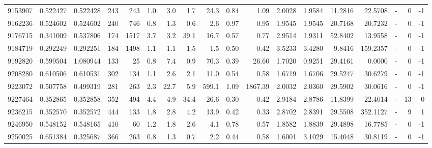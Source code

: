 \begin{tabular}{rrrrrrrrrrrrrrrlrr}
   9153907 & 0.522427 &   0.522428 &  243 &  243 &      1.0 &      3.0 &     1.7 &     24.3 &       0.84 &        1.09 &  2.0028 &  1.9584 &   11.2816 &   22.5708 &             - &        0 &         -1 \\
   9162236 & 0.524602 &   0.524602 &  240 &  746 &      0.8 &      1.3 &     0.6 &      2.6 &       0.97 &        0.95 &  1.9545 &  1.9545 &   20.7168 &   20.7232 &             - &        0 &         -1 \\
   9176715 & 0.341009 &   0.537806 &  174 & 1517 &      3.7 &      3.2 &    39.1 &     16.7 &       0.57 &        0.77 &  2.9514 &  1.9311 &   52.8402 &   13.9558 &             - &        0 &         -1 \\
   9184719 & 0.292249 &   0.292251 &  184 & 1498 &      1.1 &      1.1 &     1.5 &      1.5 &       0.50 &        0.42 &  3.5233 &  3.4280 &    9.8416 &  159.2357 &             - &        0 &         -1 \\
   9192820 & 0.599504 &   1.080944 &  133 &   25 &      0.8 &      7.4 &     0.9 &     70.3 &       0.39 &       26.60 &  1.7020 &  0.9251 &   29.4161 &    0.0000 &             - &        0 &         -1 \\
   9208280 & 0.610506 &   0.610531 &  302 &  134 &      1.1 &      2.6 &     2.1 &     11.0 &       0.54 &        0.58 &  1.6719 &  1.6706 &   29.5247 &   30.6279 &             - &        0 &         -1 \\
   9223072 & 0.507758 &   0.499319 &  281 &  263 &      2.3 &     22.7 &     5.9 &    599.1 &       1.09 &     1867.39 &  2.0032 &  2.0360 &   29.5902 &   30.0616 &             - &        0 &         -1 \\
   9227464 & 0.352865 &   0.352858 &  352 &  494 &      4.4 &      4.9 &    34.4 &     26.6 &       0.30 &        0.42 &  2.9184 &  2.8786 &   11.8399 &   22.4014 &             - &       13 &          0 \\
   9236215 & 0.352570 &   0.352572 &  444 &  133 &      1.8 &      2.8 &     4.2 &     13.9 &       0.42 &        0.33 &  2.8702 &  2.8391 &   29.5508 &  352.1127 &             - &        9 &          1 \\
   9246950 & 0.548152 &   0.548165 &  410 &   60 &      1.2 &      1.8 &     2.6 &      4.1 &       0.78 &        0.57 &  1.8582 &  1.8839 &   29.4898 &   16.7785 &             - &        0 &         -1 \\
   9250025 & 0.651384 &   0.325687 &  366 &  263 &      0.8 &      1.3 &     0.7 &      2.2 &       0.44 &        0.58 &  1.6001 &  3.1029 &   15.4048 &   30.8119 &             - &        0 &         -1 \\

\end{tabular}
